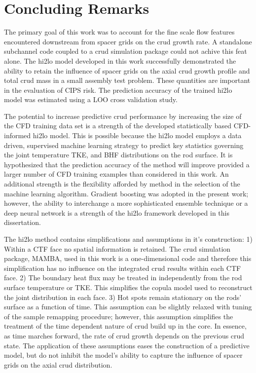 
\section{Concluding Remarks}

The primary goal of this work was to account for the fine scale flow features encountered downstream from spacer grids on the crud growth rate.  A standalone subchannel code coupled to a crud simulation package could not achive this feat alone.  The hi2lo model developed in this work successfully demonstrated the ability to retain the influence of spacer grids on the axial crud growth profile and total crud mass in a small assembly test problem.  These quantities are important in the evaluation of CIPS risk. The prediction accuracy of the trained hi2lo model was estimated using a LOO cross validation study.

The potential to increase predictive crud performance by increasing the size of the CFD training data set is a strength of the developed statistically based CFD-informed hi2lo model.  This is possible because the hi2lo model employs a data driven, supervised machine learning strategy to predict key statistics governing the joint temperature TKE, and BHF distributions on the rod surface.   It is hypothesized that the prediction accuracy of the method will improve provided a larger number of CFD training examples than considered in this work.  An additional strength is the flexibility afforded by method in the selection of the machine learning algorithm.  Gradient boosting was adopted in the present work; however, the ability to interchange a more sophisticated ensemble technique or a deep neural network is a strength of the hi2lo framework developed in this dissertation.

The hi2lo method contains simplifications and assumptions in it's construction:  1) Within a CTF face no spatial information is retained.  The crud simulation package, MAMBA, used in this work is a one-dimensional code and therefore this simplification has no influence on the integrated crud results within each CTF face.  2) The boundary heat flux may be treated in independently from the rod surface temperature or TKE.  This simplifies the copula model used to reconstruct the joint distribution in each face.  3) Hot spots remain stationary on the rods' surface as a function of time.  This assumption can be slightly relaxed with tuning of the sample remapping procedure; however, this assumption simplifies the treatment of the time dependent nature of crud build up in the core.  In essence, as time marches forward, the rate of crud growth depends on the previous crud state.  The application of these assumptions eases the construction of a predictive model, but do not inhibit the model's ability to capture the influence of spacer grids on the axial crud distribution. 

